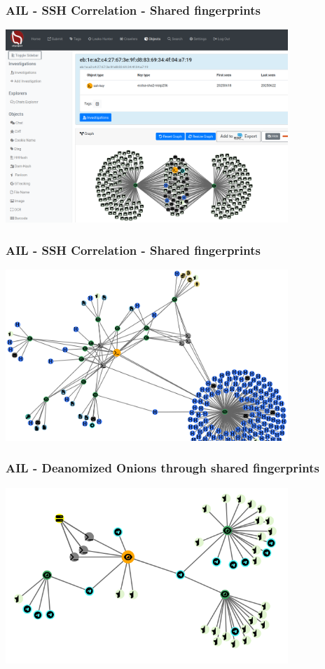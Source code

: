 \documentclass[10pt,aspectratio=169, colorlinks=true, linkcolor=circlBlue]{beamer}
\begin{document}
\begin{frame}
\frametitle{AIL - SSH Correlation - Shared fingerprints}
    \begin{center}
        \includegraphics[width=0.8\textwidth]{./img/ail-ssh-correlation-same.png}
    \end{center}
\end{frame}

\begin{frame}
\frametitle{AIL - SSH Correlation - Shared fingerprints}
    \begin{center}
        \includegraphics[width=0.8\textwidth]{./img/ail-ssh-correlation.png}
    \end{center}
\end{frame}

\begin{frame}
\frametitle{AIL - Deanomized Onions through shared fingerprints}
    \begin{center}
        \includegraphics[width=0.8\textwidth]{./img/ail-ssh-deanonimized.png}
    \end{center}
\end{frame}
\end{document}
